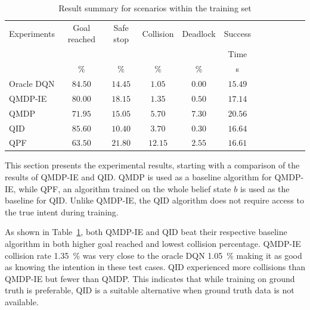 \begin{table}
	\caption{Result summary for scenarios within the training set}
	\label{tab:belief_results_summary}
	\begin{tabularx}{\columnwidth}{@{}l*{10}{c}c@{}}
	\toprule
	Experiments & Goal reached & Safe stop & Collision & Deadlock & Success \\ 
							&  						 &  &  				 &  				& Time \\ 
			 & $\%$ & $\%$ & $\%$ & $\%$ & s & \\ 
	\midrule
	Oracle DQN    & $84.50$ & $14.45$ & $1.05$ & $0.00$ & $15.49$\\ %
	\rowcolor{gray!20} {QMDP-IE}   & ${80.00}$ & ${18.15}$ & ${1.35}$ & ${0.50}$ & ${17.14}$ \\ 
	QMDP      & $71.95$ & $15.05$ & $5.70$ & $7.30$ & $20.56$ \\ 
	\rowcolor{gray!20} {QID} & ${85.60}$ & ${10.40}$ & ${3.70}$ & ${0.30}$ & ${16.64}$ \\ %
	QPF       & $63.50$ & $21.80$ & $12.15$ & $2.55$ & $16.61$ \\ %
	
	\bottomrule
	\end{tabularx}
\end{table}

This section presents the experimental results, starting with a comparison of the results of QMDP-IE and QID. QMDP is used as a baseline algorithm for QMDP-IE, while QPF, an algorithm trained on the whole belief state $b$ is used as the baseline for QID. Unlike QMDP-IE, the QID algorithm does not require access to the true intent during training.

As shown in Table~\ref{tab:belief_results_summary}, both QMDP-IE and QID beat their respective baseline algorithm in both higher goal reached and lowest collision percentage. QMDP-IE collision rate \SI{1.35}{\percent} was very close to the oracle DQN \SI{1.05}{\percent} making it as good as knowing the intention in these test cases.  
QID experienced more collisions than QMDP-IE but fewer than QMDP. This indicates that while training on ground truth is preferable, QID is a suitable alternative when ground truth data is not available.



